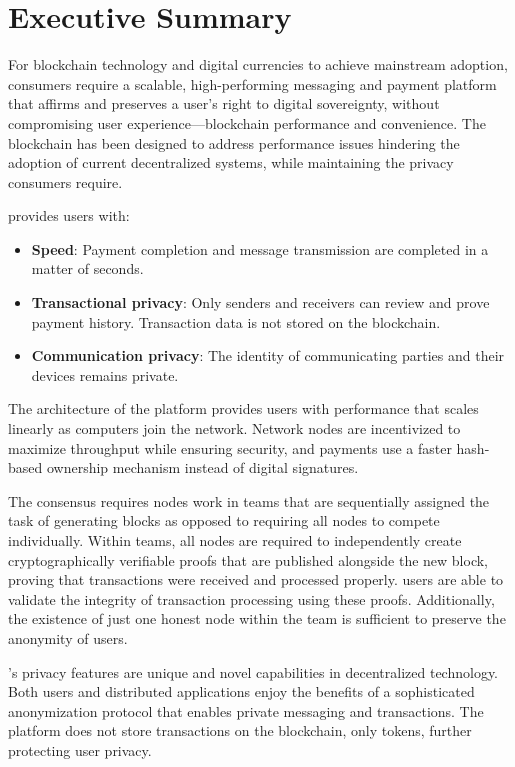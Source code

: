 \section*{Executive Summary}

For blockchain technology and digital currencies to achieve mainstream adoption, consumers require a scalable, high-performing messaging and payment platform that affirms and preserves a user's right to digital sovereignty, without compromising user experience---blockchain performance and convenience. The \name blockchain has been designed to address performance issues hindering the adoption of current decentralized systems, while maintaining the privacy consumers require.

\name provides users with:
\begin{itemize}
    \item \textbf{Speed}: Payment completion and message transmission are completed in a matter of seconds.
    \item \textbf{Transactional privacy}: Only senders and receivers can review and prove payment history. Transaction data is not stored on the blockchain.
    \item \textbf{Communication privacy}: The identity of communicating parties and their devices remains private.
\end{itemize}

The architecture of the \name platform provides users with performance that scales linearly as computers join the network. Network nodes are incentivized to maximize throughput while ensuring security, and payments use a faster hash-based ownership mechanism instead of digital signatures. 

The \name consensus requires nodes work in teams that are sequentially assigned the task of generating blocks as opposed to requiring all nodes to compete individually. Within teams, all nodes are required to independently create cryptographically verifiable proofs that are published alongside the new block, proving that transactions were received and processed properly. \name users are able to validate the integrity of transaction processing using these proofs. Additionally, the existence of just one honest node within the team is sufficient to preserve the anonymity of users. 

\name's privacy features are unique and novel capabilities in decentralized technology. Both users and distributed applications enjoy the benefits of a sophisticated anonymization protocol that enables private messaging and transactions. The platform does not store transactions on the blockchain, only tokens, further protecting user privacy.


